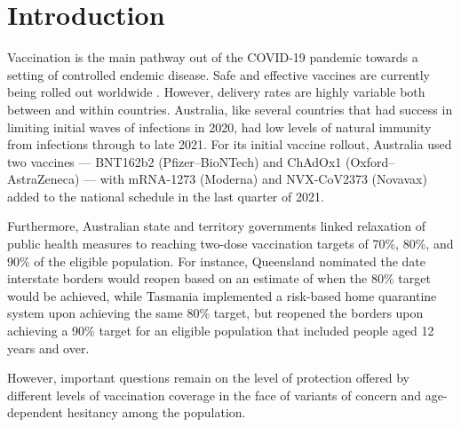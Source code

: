 \documentclass[article, a4, authoryear]{elsarticle}
\begin{document}
\section{Introduction}
Vaccination is the main pathway out of the COVID-19 pandemic towards a setting of controlled endemic disease. Safe and effective vaccines are currently being rolled out worldwide \cite{WHO_vaccines, flanagan2021sars}. However, delivery rates are highly variable both between and within countries. Australia, like several countries that had success in limiting initial waves of infections in 2020, had low levels of natural immunity from infections through to late 2021. For its initial vaccine rollout, Australia used two vaccines --- BNT162b2 (Pfizer--BioNTech) \cite{pfizer2020safety} and ChAdOx1 (Oxford--AstraZeneca) \cite{voysey2021safety} --- with mRNA-1273 (Moderna) \cite{baden2021effectiveness} and NVX-CoV2373 (Novavax) \cite{novavax2021safety} added to the national schedule in the last quarter of 2021. 

Furthermore, Australian state and territory governments linked relaxation of public health measures to reaching two-dose vaccination targets of 70\%, 80\%, and 90\% of the eligible population. For instance, Queensland nominated the date interstate borders would reopen based on an estimate of when the 80\% target would be achieved, while Tasmania implemented a risk-based home quarantine system upon achieving the same 80\% target, but reopened the borders upon achieving a 90\% target for an eligible population that included people aged 12 years and over.



However, important questions remain on the level of protection offered by different levels of vaccination coverage in the face of variants of concern and age-dependent hesitancy among the population.
\end{document}

